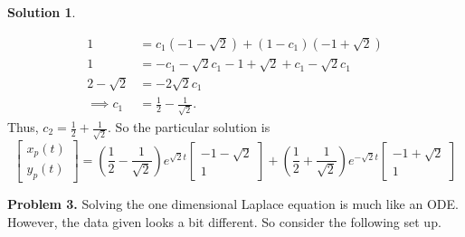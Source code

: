 \documentclass[12pt]{report} %
\theoremstyle{definition}
\newtheorem{solution}{Solution}
\begin{document}
\begin{solution}
\begin{enumerate}[(a)]
    \begin{align*}
    1 &= c_1(-1-\sqrt{2})+(1-c_1)(-1+\sqrt{2})\\
    1 &= -c_1 -\sqrt{2}c_1 -1 +\sqrt{2}+c_1-\sqrt{2}c_1\\
    2-\sqrt{2} &= -2\sqrt{2}c_1\\
    \implies c_1 &= \frac{1}{2}-\frac{1}{\sqrt{2}}.
    \end{align*}
    Thus, $c_2 = \frac{1}{2}+\frac{1}{\sqrt{2}}$. So the particular solution is
    \[
    \begin{bmatrix} x_p(t) \\ y_p(t) \end{bmatrix} = \left(\frac{1}{2}-\frac{1}{\sqrt{2}}\right) e^{\sqrt{2}t} \begin{bmatrix} -1-\sqrt{2} \\ 1 \end{bmatrix} + \left( \frac{1}{2}+\frac{1}{\sqrt{2}}\right) e^{-\sqrt{2}t} \begin{bmatrix} -1 + \sqrt{2} \\ 1 \end{bmatrix}
    \]
\end{enumerate}
\end{solution}

\vspace*{.5cm}

\noindent\textbf{Problem 3.} Solving the one dimensional Laplace equation is much like an ODE.  However, the data given looks a bit different.  So consider the following set up.
\end{document}
